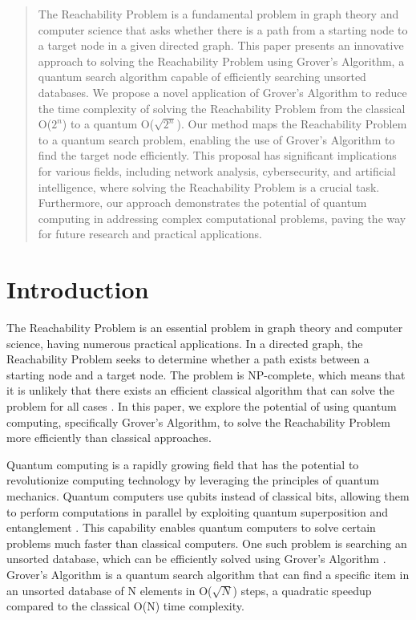 \begin{abstract}
The Reachability Problem is a fundamental problem in graph theory and computer science that asks whether there is a path from a starting node to a target node in a given directed graph. This paper presents an innovative approach to solving the Reachability Problem using Grover's Algorithm, a quantum search algorithm capable of efficiently searching unsorted databases. We propose a novel application of Grover's Algorithm to reduce the time complexity of solving the Reachability Problem from the classical O($2^n$) to a quantum O($\sqrt{2^n}$). Our method maps the Reachability Problem to a quantum search problem, enabling the use of Grover's Algorithm to find the target node efficiently. This proposal has significant implications for various fields, including network analysis, cybersecurity, and artificial intelligence, where solving the Reachability Problem is a crucial task. Furthermore, our approach demonstrates the potential of quantum computing in addressing complex computational problems, paving the way for future research and practical applications.

\end{abstract}

\section{Introduction}

The Reachability Problem is an essential problem in graph theory and computer science, having numerous practical applications. In a directed graph, the Reachability Problem seeks to determine whether a path exists between a starting node and a target node. The problem is NP-complete, which means that it is unlikely that there exists an efficient classical algorithm that can solve the problem for all cases \cite{cook1971complexity}. In this paper, we explore the potential of using quantum computing, specifically Grover's Algorithm, to solve the Reachability Problem more efficiently than classical approaches.

Quantum computing is a rapidly growing field that has the potential to revolutionize computing technology by leveraging the principles of quantum mechanics. Quantum computers use qubits instead of classical bits, allowing them to perform computations in parallel by exploiting quantum superposition and entanglement \cite{nielsen2010quantum}. This capability enables quantum computers to solve certain problems much faster than classical computers. One such problem is searching an unsorted database, which can be efficiently solved using Grover's Algorithm \cite{grover1996fast}. Grover's Algorithm is a quantum search algorithm that can find a specific item in an unsorted database of N elements in O($\sqrt{N}$) steps, a quadratic speedup compared to the classical O(N) time complexity.

